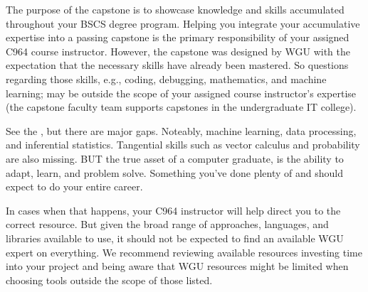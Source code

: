 \documentclass[letterpaper,10pt,english]{jupyterBook}
\begin{document}
\sphinxAtStartPar
The purpose of the capstone is to showcase knowledge and skills accumulated throughout your BSCS degree program. Helping you integrate your accumulative expertise into a passing capstone is the primary responsibility of your assigned C964 course instructor. However, the capstone was designed by WGU  with the expectation that the necessary skills have already been mastered. So questions regarding those skills, e.g., coding, debugging, mathematics, and machine learning; may be outside the scope of your assigned course instructor’s expertise (the capstone faculty team supports  capstones in the undergraduate IT college).

\begin{sphinxShadowBox}

\sphinxAtStartPar
See the , but there are major gaps. Noteably, machine learning, data processing, and inferential statistics. Tangential skills such as vector calculus and probability are also missing. BUT the true asset of a computer  graduate, is the ability to adapt, learn, and problem solve. Something you’ve done plenty of and should expect to do your entire career.
\end{sphinxShadowBox}

\sphinxAtStartPar
In cases when that happens, your C964 instructor will help direct you to the correct resource. But given the broad range of approaches, languages, and libraries available to use, it should not be expected to find an available WGU expert on everything. We recommend reviewing available resources  investing time into your project and being aware that WGU resources might be limited when choosing tools outside the scope of those listed.
\end{document}
